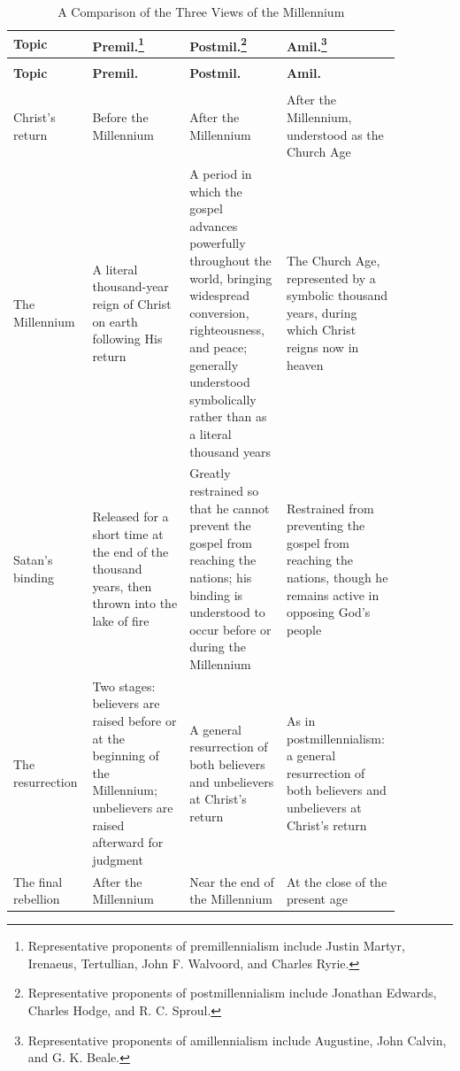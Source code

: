 \begingroup
\small
\renewcommand{\arraystretch}{1.1}
\begin{longtable}{
  >{\RaggedRight\arraybackslash}p{0.15\linewidth}
  >{\RaggedRight\arraybackslash}p{0.24\linewidth}
  >{\RaggedRight\arraybackslash}p{0.24\linewidth}
  >{\RaggedRight\arraybackslash}p{0.24\linewidth}}
\caption{A Comparison of the Three Views of the Millennium}
\label{tab:millennium}\\
\hline
\textbf{Topic} & \textbf{Premil.}\footnote{Representative proponents of premillennialism include Justin Martyr, Irenaeus, Tertullian, John F. Walvoord, and Charles Ryrie.} & \textbf{Postmil.}\footnote{Representative proponents of postmillennialism include Jonathan Edwards, Charles Hodge, and R. C. Sproul.} & \textbf{Amil.}\footnote{Representative proponents of amillennialism include Augustine, John Calvin, and G. K. Beale.} \\
\hline
\endfirsthead

\multicolumn{4}{l}{\footnotesize\itshape Table~\thetable\ (continued)}\\
\hline
\textbf{Topic} & \textbf{Premil.} & \textbf{Postmil.} & \textbf{Amil.} \\
\hline
\endhead

\hline
\multicolumn{4}{r}{\footnotesize\itshape Continued on next page}\\
\endfoot

\hline
\endlastfoot

Christ's return &
Before the Millennium &
After the Millennium &
After the Millennium, understood as the Church Age \\

The Millennium &
A literal thousand-year reign of Christ on earth following His return &
A period in which the gospel advances powerfully throughout the world, bringing widespread conversion, righteousness, and peace; generally understood symbolically rather than as a literal thousand years &
The Church Age, represented by a symbolic thousand years, during which Christ reigns now in heaven \\

Satan's binding &
Released for a short time at the end of the thousand years, then thrown into the lake of fire &
Greatly restrained so that he cannot prevent the gospel from reaching the nations; his binding is understood to occur before or during the Millennium &
Restrained from preventing the gospel from reaching the nations, though he remains active in opposing God's people \\

The resurrection &
Two stages: believers are raised before or at the beginning of the Millennium; unbelievers are raised afterward for judgment &
A general resurrection of both believers and unbelievers at Christ's return &
As in postmillennialism: a general resurrection of both believers and unbelievers at Christ's return \\

The final rebellion &
After the Millennium &
Near the end of the Millennium &
At the close of the present age \\
\end{longtable}
\endgroup
